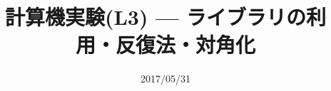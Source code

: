 \documentclass[dvipdfmx]{beamer}
\title{計算機実験(L3) --- ライブラリの利用・反復法・対角化}
\date{2017/05/31}
\begin{document}
\begin{frame}
  \titlepage
  \tableofcontents
\end{frame}






\end{document}

